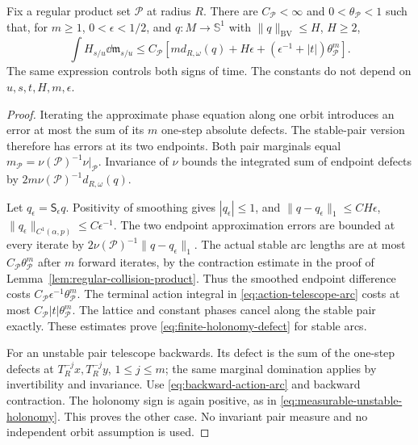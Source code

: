 \begin{lemma}
\label{lem:finite-holonomy-defect}
Fix a regular product set $\mathcal P$ at radius $R$. There are
$C_{\mathcal P}<\infty$ and $0<\theta_{\mathcal P}<1$ such that,
for $m\ge1$, $0<\epsilon<1/2$, and $q:M\to\mathbb S^1$ with
$\|q\|_{\mathrm{BV}}\le H$, $H\ge2$,
\begin{equation}\label{eq:finite-holonomy-defect}
 \int H_{s/u}\dd\mathfrak m_{s/u}
 \le C_{\mathcal P}\left[
 m d_{R,\omega}(q)+H\epsilon+
                  (\epsilon^{-1}+|t|)\theta_{\mathcal P}^{m}\right].
\end{equation}
The same expression controls both signs of time. The constants do not
depend on $u,s,t,H,m,\epsilon$.
\end{lemma}
\begin{proof}
Iterating the approximate phase equation along one orbit introduces
an error at most the sum of its $m$ one-step absolute defects. The
stable-pair version therefore has errors at its two endpoints. Both
pair marginals equal $m_{\mathcal P}=\nu(\mathcal P)^{-1}\nu|_{\mathcal P}$.
Invariance of $\nu$ bounds the integrated sum of endpoint defects by
$2m\nu(\mathcal P)^{-1}d_{R,\omega}(q)$.

Let $q_\epsilon=\mathsf S_\epsilon q$. Positivity of smoothing gives
$|q_\epsilon|\le1$, and
$\|q-q_\epsilon\|_1\le C H\epsilon$,
$\|q_\epsilon\|_{C^1(\alpha,p)}\le C\epsilon^{-1}$.
The two endpoint approximation errors are bounded at every iterate
by $2\nu(\mathcal P)^{-1}\|q-q_\epsilon\|_1$.
The actual stable arc lengths are at most
$C_{\mathcal P}\theta_{\mathcal P}^m$ after $m$ forward iterates,
by the contraction estimate in the proof of
Lemma~\ref{lem:regular-collision-product}. Thus the smoothed endpoint
difference costs $C_{\mathcal P}\epsilon^{-1}\theta_{\mathcal P}^m$.
The terminal action integral in \eqref{eq:action-telescope-arc} costs
at most $C_{\mathcal P}|t|\theta_{\mathcal P}^m$.
The lattice and constant phases cancel along the stable pair exactly.
These estimates prove \eqref{eq:finite-holonomy-defect} for stable arcs.

For an unstable pair telescope backwards. Its defect is the sum of the
one-step defects at $T_R^{-j}x,T_R^{-j}y$, $1\le j\le m$; the same
marginal domination applies by invertibility and invariance. Use
\eqref{eq:backward-action-arc} and backward contraction. The holonomy
sign is again positive, as in
\eqref{eq:measurable-unstable-holonomy}. This proves the other case.
No invariant pair measure and no independent orbit assumption is used.
\end{proof}


